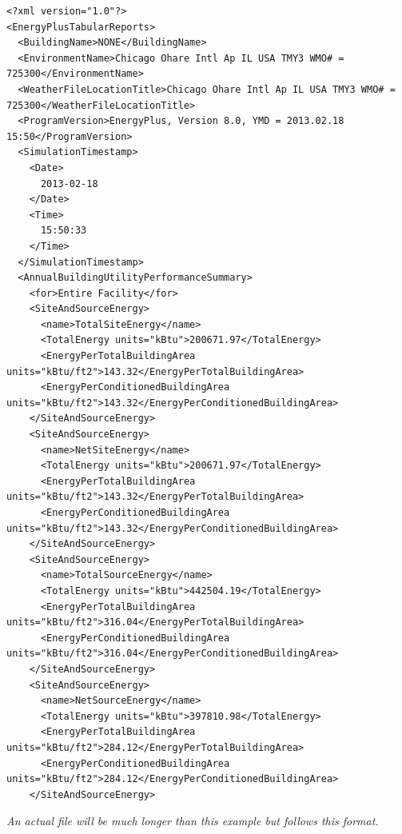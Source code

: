 \begin{lstlisting}
<?xml version="1.0"?>
<EnergyPlusTabularReports>
  <BuildingName>NONE</BuildingName>
  <EnvironmentName>Chicago Ohare Intl Ap IL USA TMY3 WMO# = 725300</EnvironmentName>
  <WeatherFileLocationTitle>Chicago Ohare Intl Ap IL USA TMY3 WMO# = 725300</WeatherFileLocationTitle>
  <ProgramVersion>EnergyPlus, Version 8.0, YMD = 2013.02.18 15:50</ProgramVersion>
  <SimulationTimestamp>
    <Date>
      2013-02-18
    </Date>
    <Time>
      15:50:33
    </Time>
  </SimulationTimestamp>
  <AnnualBuildingUtilityPerformanceSummary>
    <for>Entire Facility</for>
    <SiteAndSourceEnergy>
      <name>TotalSiteEnergy</name>
      <TotalEnergy units="kBtu">200671.97</TotalEnergy>
      <EnergyPerTotalBuildingArea units="kBtu/ft2">143.32</EnergyPerTotalBuildingArea>
      <EnergyPerConditionedBuildingArea units="kBtu/ft2">143.32</EnergyPerConditionedBuildingArea>
    </SiteAndSourceEnergy>
    <SiteAndSourceEnergy>
      <name>NetSiteEnergy</name>
      <TotalEnergy units="kBtu">200671.97</TotalEnergy>
      <EnergyPerTotalBuildingArea units="kBtu/ft2">143.32</EnergyPerTotalBuildingArea>
      <EnergyPerConditionedBuildingArea units="kBtu/ft2">143.32</EnergyPerConditionedBuildingArea>
    </SiteAndSourceEnergy>
    <SiteAndSourceEnergy>
      <name>TotalSourceEnergy</name>
      <TotalEnergy units="kBtu">442504.19</TotalEnergy>
      <EnergyPerTotalBuildingArea units="kBtu/ft2">316.04</EnergyPerTotalBuildingArea>
      <EnergyPerConditionedBuildingArea units="kBtu/ft2">316.04</EnergyPerConditionedBuildingArea>
    </SiteAndSourceEnergy>
    <SiteAndSourceEnergy>
      <name>NetSourceEnergy</name>
      <TotalEnergy units="kBtu">397810.98</TotalEnergy>
      <EnergyPerTotalBuildingArea units="kBtu/ft2">284.12</EnergyPerTotalBuildingArea>
      <EnergyPerConditionedBuildingArea units="kBtu/ft2">284.12</EnergyPerConditionedBuildingArea>
    </SiteAndSourceEnergy>
\end{lstlisting}

\textit{An actual file will be much longer than this example but follows this format.}
